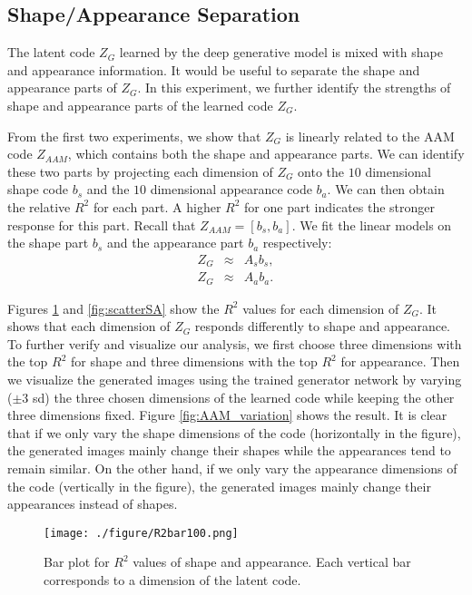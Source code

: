 \documentclass{article}
\begin{document}
\subsection{Shape/Appearance Separation}
The  latent code $Z_{G}$ learned by the deep generative model is  mixed with shape and appearance information.  It would be useful to separate the shape and appearance parts of $Z_{G}$. In this experiment, we further identify the strengths of shape and appearance parts of the learned code $Z_{G}$. 

From the first two experiments, we show that $Z_{G}$ is linearly related to the AAM code $Z_{AAM}$, which contains both the shape and appearance parts. We can identify these two parts by projecting each dimension of $Z_{G}$ onto the $10$ dimensional shape code $b_s$ and the $10$ dimensional appearance code $b_a$. We can then obtain the relative $R^2$ for each part. A higher $R^2$ for one part indicates the stronger response for this part. Recall that $Z_{AAM} = [b_s, b_a]$. We fit the linear models on the shape part $b_s$ and the appearance part  $b_a$ respectively:
\begin{eqnarray}
Z_{G} &\approx& A_{s}  b_s, \\
Z_{G} &\approx& A_{a}  b_a.
\end{eqnarray}     

Figures \ref{fig:barSA} and \ref{fig:scatterSA} show the $R^2$ values for each dimension of $Z_{G}$. It shows that each dimension of $Z_G$ responds differently to shape and appearance. To further verify and visualize our analysis, we first choose three dimensions with the top $R^2$ for shape  and three dimensions with the top $R^2$ for appearance. Then we visualize the generated images using the trained generator network by varying ($\pm 3$ sd) the three chosen dimensions of the learned code while keeping the other three dimensions fixed. Figure \ref{fig:AAM_variation} shows the result. It is clear that if we only vary the shape dimensions of the code (horizontally in the figure), the generated images mainly change their shapes while the appearances tend to remain similar. On the other hand, if we only vary the appearance dimensions of the code (vertically in the figure), the generated images mainly change their appearances instead of shapes.  
\begin{figure}[h]
	\begin{center}
		\texttt{[image: ./figure/R2bar100.png]}%
		\caption{Bar plot for $R^2$ values of shape and appearance. Each vertical bar corresponds to a dimension of the latent code. }
		\label{fig:barSA}
	\end{center}
\end{figure}
\end{document}
